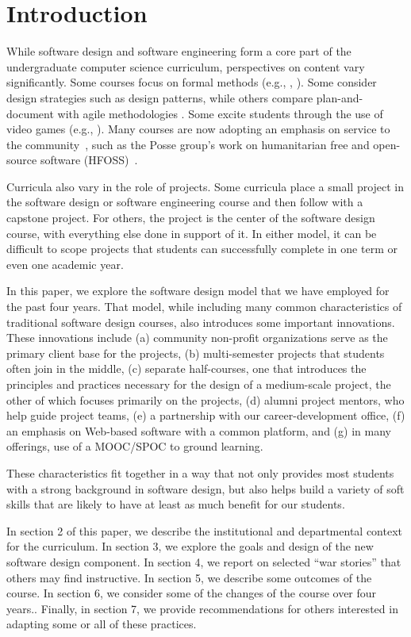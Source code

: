 
\section{Introduction}

While software design and software engineering form a core part of
the undergraduate computer science curriculum, perspectives on 
content vary significantly.  Some courses
focus on formal methods (e.g., \cite{liu-2009}, \cite{garcia-2014}).
Some consider design strategies such as design patterns, while others
compare plan-and-document with agile methodologies
\cite{gestwicki-2018}.  Some excite students through the use of
video games (e.g., \cite{wolz-2007}).  Many courses are now adopting
an emphasis on service to the community~\cite{hfoss-2018}, 
such as the Posse group's work on
humanitarian free and open-source software (HFOSS)~\cite{posse-2018}.

Curricula also vary in the role of projects.  Some curricula place
a small project in the software design or software engineering
course and then follow with a capstone project.  For others,
the project is the center of the software design course, with
everything else done in support of it. In either model, it can be difficult to 
scope projects that students can successfully complete 
in one term or even one academic year.

In this paper, we explore the software design model that we have
employed for the past four years.  That model, while including many
common characteristics of traditional software design courses, also
introduces some important innovations.  These innovations include
(a) community non-profit organizations serve as the primary client
base for the projects,
(b) multi-semester projects that students often join in the middle,
(c) separate half-courses, one that introduces
the principles and practices necessary for the design of a medium-scale
project, the other of which focuses primarily on the projects, 
(d) alumni project mentors, who help guide project teams, 
(e) a partnership with our career-development office, 
(f) an emphasis on Web-based software with a common platform, and 
(g) in many offerings, use of a MOOC/SPOC to ground learning.

These characteristics fit together in a way that not only provides
most students with a strong background in software design, but also
helps build a variety of soft skills that are likely to have at
least as much benefit for our students.

In section 2 of this paper, we describe the institutional and
departmental context for the curriculum.  In section 3, we explore
the goals and design of the new software design component.  In
section 4, we report on selected ``war stories'' that others may
find instructive.  In section 5, we describe some outcomes of the
course.  In section 6, we consider some of the changes of the course
over four years..  Finally, in section 7, we provide recommendations
for others interested in adapting some or all of these practices.

